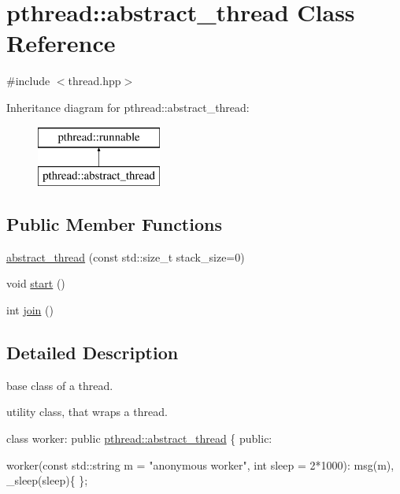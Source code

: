 \hypertarget{classpthread_1_1abstract__thread}{\section{pthread\+:\+:abstract\+\_\+thread Class Reference}
\label{classpthread_1_1abstract__thread}
}


{\ttfamily \#include $<$thread.\+hpp$>$}

Inheritance diagram for pthread\+:\+:abstract\+\_\+thread\+:\begin{figure}[H]
\begin{center}
\leavevmode
\includegraphics[height=2.000000cm]{classpthread_1_1abstract__thread}
\end{center}
\end{figure}
\subsection*{Public Member Functions}
\begin{DoxyCompactItemize}
\item 
\hyperlink{classpthread_1_1abstract__thread_aef9de5da73087b69d00f71985a4cbdef}{abstract\+\_\+thread} (const std\+::size\+\_\+t stack\+\_\+size=0)
\item 
void \hyperlink{classpthread_1_1abstract__thread_ab121718028f3ca68d45db84d10ff2a3a}{start} ()
\item 
int \hyperlink{classpthread_1_1abstract__thread_aedac81bb9eb76ba92c49c48d797ea25b}{join} ()
\end{DoxyCompactItemize}


\subsection{Detailed Description}
base class of a thread.

utility class, that wraps a thread. 
\begin{DoxyPre}{\ttfamily 
class worker: public \hyperlink{classpthread_1_1abstract__thread}{pthread::abstract\_thread} \{
public:}\end{DoxyPre}



\begin{DoxyPre}{\ttfamily   worker(const std::string m = "anonymous worker", int sleep = 2*1000): msg(m), \_sleep(sleep)\{
  \};}\end{DoxyPre}



